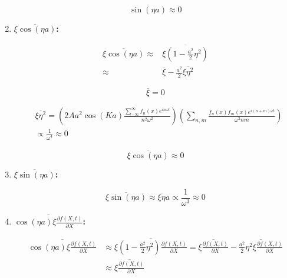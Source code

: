 \begin{enumerate}
    \begin{equation}\label{eq:B.29}
            \overline{\sin(\eta a)} \approx 0
    \end{equation}

\item  \textbf{$\overline{\xi\cos(\eta a)}$:}

    \begin{equation}\label{eq:B.30}
        \begin{split}
            \overline{\xi\cos(\eta a)} \approx & \overline{\xi( 1-\frac{a^2}{2}\eta^2)}\\
            \approx & \overline{\xi}-\frac{a^2}{2}\overline{\xi \eta^2}
        \end{split}
    \end{equation}

    \begin{equation}\label{eq:B.31}
        \overline{\xi}=0
    \end{equation}

    \begin{equation}\label{eq:B.32}
        \begin{split}
        &\overline{\xi\eta^2}= (2Aa^2\cos(Ka)\frac{\sum_{-\infty}^{\infty} f_n(x)e^{i n\omega t}}{n^2\omega^2})(\sum_{n,m} \frac{f_n(x)f_m(x)e^{i(n+m)\omega t}}{\omega^2nm}) \\ &\propto \frac{1}{\omega^4} \approx 0  
        \end{split}
    \end{equation}

    \begin{equation}\label{eq:B.33}
            \overline{\xi \cos(\eta a)} \approx 0    
    \end{equation}

\item \textbf{ $\overline{\xi \sin(\eta a)}$: }

    \begin{equation}\label{eq:B.34}
            \overline{\xi \sin(\eta a)} \approx \overline{\xi \eta}a \propto \frac{1}{\omega^3} \approx 0
    \end{equation}

\item  \textbf{$\overline{\cos(\eta a)\xi \frac{\partial f(X,t)}{\partial X}}$:}

    \begin{equation}\label{eq:B.35}
        \begin{split}
            \overline{\cos(\eta a)\xi \frac{\partial f(X,t)}{\partial X}} &\approx \overline{\xi(1-\frac{a^2}{2}\eta^2) \frac{\partial f(X,t)}{\partial X}}=\overline{\xi\frac{\partial f(X,t)}{\partial X}}-\overline{\frac{a^2}{2}\eta^2\xi\frac{\partial f(X,t)}{\partial X}}\\
            &\approx \overline{\xi\frac{\partial f(X,t)}{\partial X}}
        \end{split}
    \end{equation}


\end{enumerate}
